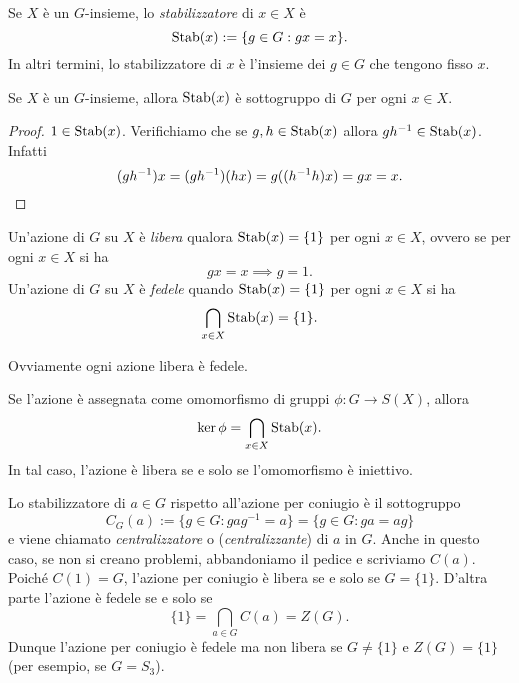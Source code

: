 
\begin{defi}
Se $X$ è un $G$-insieme, lo {\em stabilizzatore} di $x\in X$ è
\[
\operatorname{Stab}(x):=\{g\in G :  gx=x\} .
\]
In altri termini, lo stabilizzatore di \(x\) è l'insieme dei $g \in G$ che tengono fisso $x$.
\end{defi}

\begin{prop}
Se $X$ è un $G$-insieme, allora $\operatorname{Stab}(x)$ è sottogruppo di $G$ per ogni $x \in X$.
\end{prop}

\begin{proof}
$1 \in \operatorname{Stab}(x)$. Verifichiamo che se $g,h \in \operatorname{Stab}(x)$ allora $gh^{-1}\in\operatorname{Stab}(x)$. Infatti
\[
(gh^{-1})x=(gh^{-1})(hx)=g((h^{-1}h)x)=gx=x .\qedhere
\]
\end{proof}

\begin{defi}
Un'azione di $G$ su $X$ è {\em libera} qualora $\operatorname{Stab}(x)=\{1\}$ per ogni $x\in X$, ovvero se per ogni $x \in X$ si ha
\[
gx = x \implies g = 1 .
\]
Un'azione di $G$ su $X$ è {\em fedele} quando $\operatorname{Stab}(x)=\{1\}$ per ogni $x\in X$ si ha
\[
\bigcap_{x\in X}\operatorname{Stab}(x)=\{1\} .
\]
\end{defi}

Ovviamente ogni azione libera è fedele.

\begin{osse}
Se l'azione è assegnata come omomorfismo di gruppi $\phi : G\to S(X)$, allora
\[\ker \phi = \bigcap_{x\in X}\operatorname{Stab}(x). \]
In tal caso, l'azione è libera se e solo se l'omomorfismo è iniettivo.
\end{osse}

\begin{esem}
Lo stabilizzatore di $a\in G$ rispetto all'azione per coniugio è il sottogruppo
\[ C_G(a):=\{g\in G : gag^{-1}=a\}=\{g\in G : ga=ag\} \]
e viene chiamato {\em centralizzatore} o ({\em centralizzante}) di $a$ in $G$. Anche in questo caso, se non si creano problemi, abbandoniamo il pedice e scriviamo $C(a)$. Poiché $ C(1)=G$, l'azione per coniugio è libera se e solo se $G=\{1\}$. D'altra parte l'azione è fedele se e solo se
\[ \{1\}=\bigcap_{a\in G} C(a) = Z(G) . \]
Dunque l'azione per coniugio è fedele ma non libera se $G \ne \{1\}$ e $Z(G) = \{1\}$ (per esempio, se $G = S_3$).
\end{esem}

